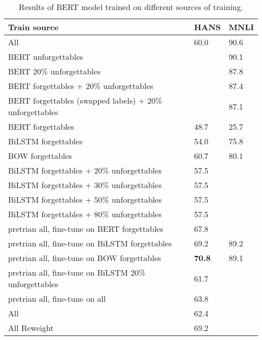 \iffalse
\begin{table}[h]
    \caption{Results of BERT model trained on different sources of training. }
    \label{tab:twoclass}
    \centering
    \begin{tabular}{l | l l}
        Train source & HANS & MNLI \\
        \hline
        All & 60.0 & 90.6\\
        \hline
        BERT unforgettables & & 90.1 \\
        BERT 20\% unforgettables & & 87.8 \\
        BERT forgettables + 20\% unforgettables & & 87.4 \\
        BERT forgettables (swapped labels) + 20\% unforgettables & & 87.1 \\
        BERT forgettables & 48.7 & 25.7 \\
        BiLSTM forgettables                       & 54.0 & 75.8 \\
        BOW forgettables                        & 60.7 & 80.1 \\
        BiLSTM forgettables + 20\% unforgettables & 57.5 & \\
        BiLSTM forgettables + 30\% unforgettables & 57.5 & \\
        BiLSTM forgettables + 50\% unforgettables & 57.5 & \\
        BiLSTM forgettables + 80\% unforgettables & 57.5 & \\
        \hline 
        pretrian all, fine-tune on BERT forgettables & 67.8 & \\
        pretrian all, fine-tune on BiLSTM forgettables & 69.2 & 89.2 \\
        pretrian all, fine-tune on BOW forgettables & \textbf{70.8} & 89.1\\
        \hline 
        pretrian all, fine-tune on BiLSTM 20\% unforgettables & 61.7 & \\
        pretrian all, fine-tune on all & 63.8 & \\
        \hline 
        All \citep{clark2019dont} & 62.4 & \\
        All Reweight \citep{clark2019dont} & 69.2 \\
        
    \end{tabular}
\end{table}


